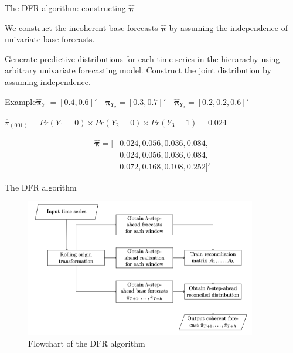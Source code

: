 \documentclass[12pt]{beamer}
\begin{document}
\begin{frame}{The DFR algorithm: constructing $\hat{\boldsymbol{\pi}}$ }

    We construct the incoherent base forecasts $\hat{\boldsymbol{\pi}}$ by assuming the independence of univariate base forecasts.

    \begin{outline}[enumerate]
        \1 Generate predictive distributions for each time series in the hierarachy using arbitrary univariate forecasting model.
        \1 Construct the joint distribution by assuming independence.
    \end{outline}

    \begin{block}{Example}$\hat{\boldsymbol{\pi}}_{Y_1} = [0.4, 0.6]'\quad \hat{\boldsymbol{\pi}}_{Y_2} = [0.3, 0.7]' \quad \hat{\boldsymbol{\pi}}_{Y_3} = [0.2, 0.2, 0.6]'$

        $
          \hat{\pi}_{(001)} = Pr(Y_1=0) \times Pr(Y_2=0) \times Pr(Y_3=1) =  0.024
        $

        \[\begin{aligned}
          \hat{\boldsymbol{\pi}} = [&0.024,0.056,0.036,0.084, \\ &0.024,0.056,0.036,0.084, \\ &0.072,0.168,0.108,0.252]'
        \end{aligned}\]
    \end{block}
\end{frame}


\begin{frame}{The DFR algorithm}
\begin{figure}
    \includegraphics[width=0.9\textwidth]{figures/dfr.png}
    \caption{Flowchart of the DFR algorithm}        
\end{figure}
\end{frame}
\end{document}

